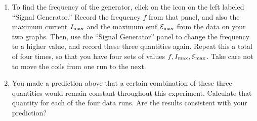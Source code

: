 \begin{enumerate}[labparts]
\item  To find the frequency of the generator, click on the icon on the left labeled ``Signal Generator.''  Record the frequency $f$ from that panel, and also the maximum current $I_{\rm max}$ and the
maximum emf ${\cal E}_{\rm max}$ from the data on your two graphs.
Then, use the ``Signal Generator'' panel to change the frequency to a higher value,
and record these three quantities again.  Repeat this a total of four
times, so that you have four sets of values $f, I_{\rm max}, {\cal E}_{\rm max}$.
Take care not to move the coils from one run to the next.
\answerspace{3in}

\item  You made a prediction above that a certain combination of these
three quantities would remain constant throughout this experiment.
Calculate that quantity for each of the four data runs.  Are the
results consistent with your prediction?
\answerspace{3in}
\end{enumerate}


